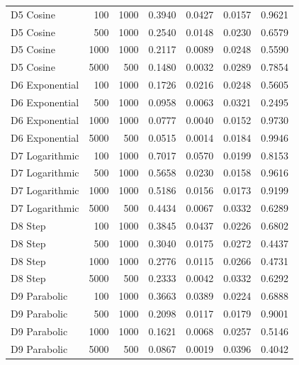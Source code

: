 \begin{tabular}{lrrrrrr}
      D5 Cosine &   100 &  1000 &   0.3940 &  0.0427 &   0.0157 &   0.9621 \\
      D5 Cosine &   500 &  1000 &   0.2540 &  0.0148 &   0.0230 &   0.6579 \\
      D5 Cosine &  1000 &  1000 &   0.2117 &  0.0089 &   0.0248 &   0.5590 \\
      D5 Cosine &  5000 &   500 &   0.1480 &  0.0032 &   0.0289 &   0.7854 \\
 D6 Exponential &   100 &  1000 &   0.1726 &  0.0216 &   0.0248 &   0.5605 \\
 D6 Exponential &   500 &  1000 &   0.0958 &  0.0063 &   0.0321 &   0.2495 \\
 D6 Exponential &  1000 &  1000 &   0.0777 &  0.0040 &   0.0152 &   0.9730 \\
 D6 Exponential &  5000 &   500 &   0.0515 &  0.0014 &   0.0184 &   0.9946 \\
 D7 Logarithmic &   100 &  1000 &   0.7017 &  0.0570 &   0.0199 &   0.8153 \\
 D7 Logarithmic &   500 &  1000 &   0.5658 &  0.0230 &   0.0158 &   0.9616 \\
 D7 Logarithmic &  1000 &  1000 &   0.5186 &  0.0156 &   0.0173 &   0.9199 \\
 D7 Logarithmic &  5000 &   500 &   0.4434 &  0.0067 &   0.0332 &   0.6289 \\
        D8 Step &   100 &  1000 &   0.3845 &  0.0437 &   0.0226 &   0.6802 \\
        D8 Step &   500 &  1000 &   0.3040 &  0.0175 &   0.0272 &   0.4437 \\
        D8 Step &  1000 &  1000 &   0.2776 &  0.0115 &   0.0266 &   0.4731 \\
        D8 Step &  5000 &   500 &   0.2333 &  0.0042 &   0.0332 &   0.6292 \\
   D9 Parabolic &   100 &  1000 &   0.3663 &  0.0389 &   0.0224 &   0.6888 \\
   D9 Parabolic &   500 &  1000 &   0.2098 &  0.0117 &   0.0179 &   0.9001 \\
   D9 Parabolic &  1000 &  1000 &   0.1621 &  0.0068 &   0.0257 &   0.5146 \\
   D9 Parabolic &  5000 &   500 &   0.0867 &  0.0019 &   0.0396 &   0.4042 \\
\bottomrule
\end{tabular}
